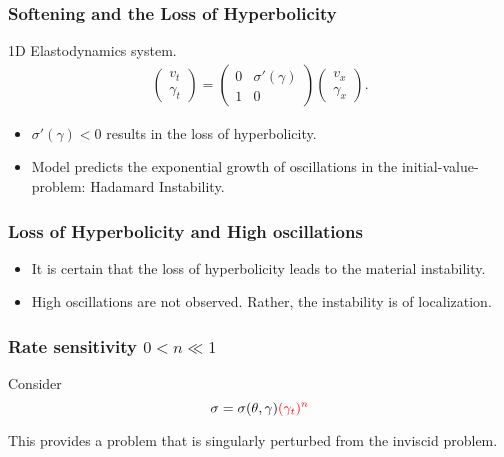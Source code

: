 \documentclass{beamer}
\def\red{\color{red}}
\def\blue{\color{blue}}
\begin{document}
\begin{frame}
 \frametitle{Softening and the Loss of Hyperbolicity}
 1D Elastodynamics system.
 \begin{align*}
  \begin{pmatrix}
   v_t\\ \gamma_t
  \end{pmatrix}
  = \begin{pmatrix}
   0 &\sigma'(\gamma)\\ 1 & 0
  \end{pmatrix} 
  \begin{pmatrix}
   v_x\\ \gamma_x
  \end{pmatrix}.
 \end{align*}
 \vfill
 \begin{itemize}
  \item $\sigma'(\gamma)<0$ results in the loss of hyperbolicity.
  \item Model predicts the exponential growth of oscillations in the initial-value-problem: {\blue Hadamard Instability}.
 \end{itemize}
\end{frame}



\begin{frame}
 \frametitle{Loss of Hyperbolicity and High oscillations}
 \begin{itemize}
  \item It is certain that the loss of hyperbolicity leads to the material instability.
  \item High oscillations are not observed. Rather, the instability is of localization.
 \end{itemize}
 \vfill
\end{frame}

\begin{frame}
 \frametitle{Rate sensitivity $0<n\ll1$}
 Consider
 $$\sigma=\sigma(\theta,\gamma){\red (\gamma_t)^n}$$
 
 This provides a problem that is singularly perturbed from the inviscid problem.
 \vfill
\end{frame}
\end{document}

